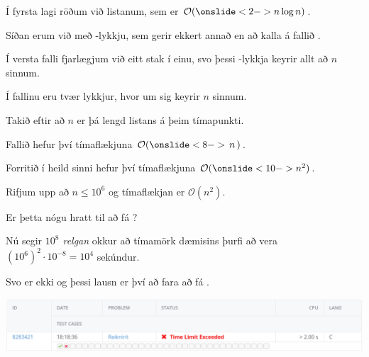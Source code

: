 {
	{
		\item<1-> Í fyrsta lagi röðum við listanum, sem er $\mathcal{O}(\onslide<2->{n \log n})$.
		\item<3-> Síðan erum við með -lykkju, sem gerir ekkert annað en að kalla á fallið .
		\item<4-> Í versta falli fjarlægjum við eitt stak í einu, svo þessi -lykkja keyrir allt að $n$ sinnum.
		\item<5-> Í fallinu  eru tvær lykkjur, hvor um sig keyrir $n$ sinnum.
		\item<6-> Takið eftir að $n$ er þá lengd listans á þeim tímapunkti.
		\item<7-> Fallið  hefur því tímaflækjuna $\mathcal{O}(\onslide<8->{\,n\,})$.
		\item<9-> Forritið í heild sinni hefur því tímaflækjuna $\mathcal{O}(\onslide<10->{n^2})$.
	}
}

{
	{
		\item<1-> Rifjum upp að $n \leq 10^6$ og tímaflækjan er $\mathcal{O}(n^2)$.
		\item<2-> Er þetta nógu hratt til að fá ?
		\item<3-> Nú segir \emph{$10^8$ relgan} okkur að tímamörk dæmisins þurfi að vera $(10^6)^2 \cdot 10^{-8} = 10^4$ sekúndur.
		\item<4-> Svo er ekki og þessi lausn er því að fara að fá .
		\item<5->[] \includegraphics[scale = 0.25]{fig/tle}
	}
}

{
}


